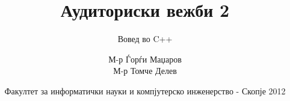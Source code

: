 

\author[АВ2]{М-р Ѓорѓи Маџаров\\М-р Томче Делев}
\title[Објектно ориентирано програмирање]{Аудиториски вежби 2}
\subtitle{Вовед во C++}
\date{Факултет за информатички науки и компјутерско инженерство - Скопје 2012}





\frame[t,plain]{\titlepage}











